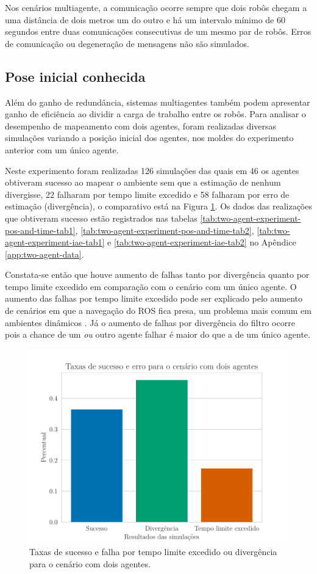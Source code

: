 Nos cenários multiagente, a comunicação ocorre sempre que dois robôs 
chegam a uma distância de dois metros um do outro e há um intervalo 
mínimo de 60 segundos entre duas comunicações consecutivas de um mesmo 
par de robôs. Erros de comunicação ou degeneração de mensagens não são 
simulados.

\subsection{Pose inicial conhecida}
\label{sec:exp-known-initial-pose}
Além do ganho de redundância, sistemas multiagentes também podem 
apresentar ganho de eficiência ao dividir a carga de trabalho entre os 
robôs. Para analisar o desempenho de mapeamento com dois agentes, 
foram realizadas diversas simulações variando a posição inicial dos 
agentes, nos moldes do experimento anterior com um único agente.

Neste experimento foram realizadas 126 simulações das quais em 46 os 
agentes obtiveram sucesso ao mapear o ambiente sem que a estimação de 
nenhum divergisse, 22 falharam por tempo limite excedido e 58 
falharam por erro de estimação (divergência), o comparativo está na 
Figura \ref{fig:exp-two-robot-sucess-rate}. Os dados das realizações 
que obtiveram sucesso estão registrados nas tabelas \ref{tab:two-agent-experiment-pos-and-time-tab1}, \ref{tab:two-agent-experiment-pos-and-time-tab2}, \ref{tab:two-agent-experiment-iae-tab1} e \ref{tab:two-agent-experiment-iae-tab2} no Apêndice \ref{app:two-agent-data}.

Constata-se então que houve aumento de falhas 
tanto por divergência quanto por tempo limite excedido em comparação 
com o cenário com um único agente. O aumento das falhas por tempo limite 
excedido pode ser explicado pelo aumento de cenários em que a navegação do 
ROS fica presa, um problema mais comum em ambientes dinâmicos \cite{zheng2021ros}. Já o aumento de falhas por divergência do filtro ocorre 
pois a chance de um \emph{ou} outro agente falhar é maior do que a de um único agente.

\begin{figure}
  \centering
  \includegraphics[width=.7\textwidth]{figs/success_rate_bar_two_agents.pdf}
  \caption[Taxas de sucesso e falha para simulações com dois agentes]{Taxas de sucesso e falha por tempo limite excedido ou divergência para o cenário com dois agentes.}
  \label{fig:exp-two-robot-sucess-rate}
\end{figure}

